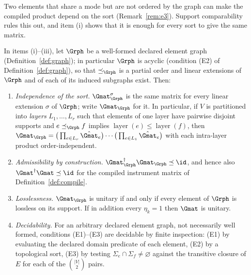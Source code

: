 
Two elements that share a mode but are not ordered by the graph can make the
compiled product depend on the sort (Remark~\ref{rem:e3}). Support
comparability rules this out,
and item (i) shows that it is enough for every sort to give the same matrix.

\begin{theorem}\label{thm:compilation-well-defined}
In items (i)--(iii), let $\Grph$ be a well-formed declared element graph
(Definition~\ref{def:graph}); in particular $\Grph$ is acyclic
(condition (E2) of Definition~\ref{def:graph}), so that $\preceq_\Grph$ is a partial order and
linear extensions of $\Grph$ and of each of its induced subgraphs exist.
Then:
\begin{enumerate}[label=(\roman*),leftmargin=3.0em]
\item \emph{Independence of the sort.} $\Gmat^{\sigma}_{\Grph}$ is the same
  matrix for every linear extension $\sigma$ of $\Grph$; write
  $\Gmat_{\Grph}$ for it. In particular, if $V$ is partitioned into
  \emph{layers} $L_1,\dots,L_r$ such that elements of one layer have pairwise
  disjoint supports and $e\preceq_\Grph f$ implies
  $\operatorname{layer}(e)\le\operatorname{layer}(f)$, then
  $\Gmat_\Grph=\big(\prod_{e\in L_r}\hat\Gmat_e\big)\cdots
  \big(\prod_{e\in L_1}\hat\Gmat_e\big)$ with each intra-layer product
  order-independent.
\item \emph{Admissibility by construction.}
  $\Gmat_\Grph^\dagger\Gmat_\Grph\preceq\id$, and hence also
  $\Gmat^\dagger\Gmat\preceq\id$ for the compiled instrument matrix of
  Definition~\ref{def:compile}.
\item \emph{Losslessness.} $\Gmat_\Grph$ is unitary if and only if every
  element of $\Grph$ is lossless on its support. If in addition every
  $\eta_k=1$ then $\Gmat$ is unitary.
\item \emph{Decidability.} For an arbitrary declared element graph, not
  necessarily well formed, conditions (E1)--(E3) are decidable by finite
  inspection: (E1) by evaluating the declared domain predicate of each
  element, (E2) by a topological sort, (E3) by testing
  $\Sigma_e\cap\Sigma_f\neq\varnothing$ against the transitive closure of $E$
  for each of the $\binom{|V|}{2}$ pairs.
\end{enumerate}
\end{theorem}

